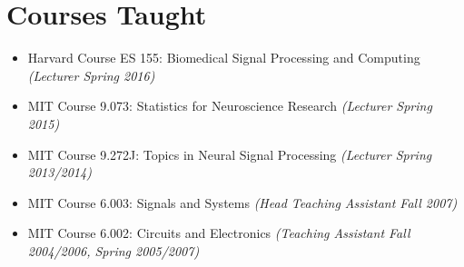 \section*{Courses Taught}

  \begin{itemize}
   	  \item Harvard Course ES 155: Biomedical Signal Processing and Computing \emph{(Lecturer Spring 2016)}
      \item MIT Course 9.073: Statistics for Neuroscience Research \emph{(Lecturer Spring 2015)}
      \item MIT Course 9.272J: Topics in Neural Signal Processing \emph{(Lecturer Spring 2013/2014)}
      \item MIT Course 6.003: Signals and Systems \emph{(Head Teaching Assistant Fall 2007)}
      \item MIT Course 6.002: Circuits and Electronics \emph{(Teaching Assistant Fall 2004/2006, Spring 2005/2007)}
  \end{itemize}
